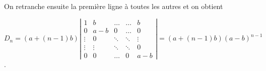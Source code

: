 {\begin{enumerate}
{On retranche ensuite la première ligne à toutes les autres et on obtient

\begin{center}
$D_n=(a+(n-1)b)\left|
\begin{array}{ccccc}
1&b&\ldots&\ldots&b\\
0&a-b&0&\ldots&0\\
\vdots&0&\ddots&\ddots&\vdots\\
\vdots&\vdots&\ddots&\ddots&0\\
0&0&\ldots&0&a-b
\end{array}
\right|=(a+(n-1)b)(a-b)^{n-1}$.
\end{center}

\begin{center}
\end{center}}
\end{enumerate}
}
